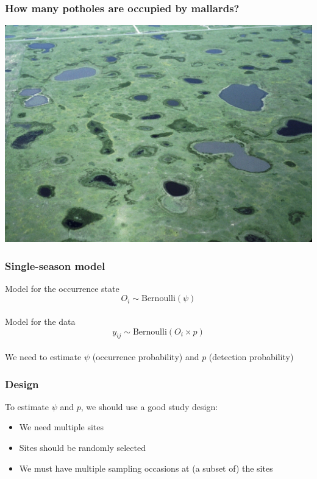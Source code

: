 \documentclass[color=usenames,dvipsnames]{beamer}\usepackage[]{graphicx}\usepackage[]{color}
\begin{document}
\begin{frame}
  \frametitle{\normalsize How many potholes are occupied by mallards?}
  \begin{center}
    \includegraphics[width=\textwidth]{figs/Prairie_Pothole_Wetlands}
  \end{center}
\end{frame}





\begin{frame}
  \frametitle{Single-season model}
  \large
  {\centering Model for the occurrence state}
  \[
    O_{i} \sim \mbox{Bernoulli}(\psi)
  \] \\
  \pause
  \vspace{0.4cm}
  {\centering Model for the data}
  \[
    y_{ij} \sim \mbox{Bernoulli}(O_i \times p)
  \] \\
  \pause
  \vspace{0.5cm}
  We need to estimate $\psi$ (occurrence probability) and $p$ (detection probability)
\end{frame}





\begin{frame}
  \frametitle{Design}
  \large
  To estimate $\psi$ and $p$, we should use a good study design:
  \begin{itemize}[<+->]
    \item We need multiple sites
    \item Sites should be randomly selected
    \item We must have multiple sampling occasions at (a subset of) the sites
  \end{itemize}
\end{frame}
\end{document}
